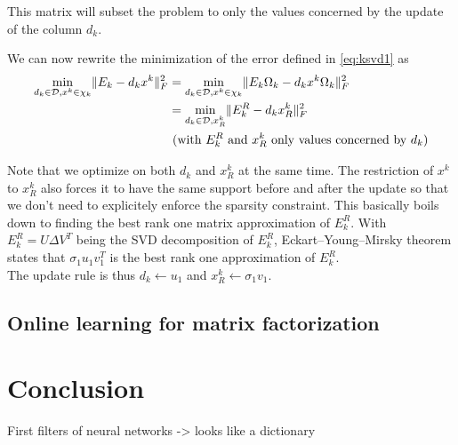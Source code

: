 \documentclass[a4paper,11pt]{article}
\DeclarePairedDelimiter\norm{\lVert}{\rVert} %
\begin{document}
This matrix will subset the problem to only the values concerned by the update of the column $d_k$.

We can now rewrite the minimization of the error defined in \ref{eq:ksvd1} as
\begin{equation*}
\begin{split}
  \min_{d_k \in \mathcal{D}, x^k \in \chi_k} \norm{E_k - d_k x^k }_F^2 & = \min_{d_k \in \mathcal{D}, x^k \in \chi_k} \norm{E_k \Omega_k - d_k x^k \Omega_k}_F^2 \\
  											& = \min_{d_k \in \mathcal{D}, x^k_R} \norm{E_k^R - d_k x^k_R}_F^2 \\
                                            & \text{ (with $E_k^R$ and $x^k_R$ only values concerned by $d_k$)}
\end{split}
\end{equation*}

Note that we optimize on both $d_k$ and $x^k_R$ at the same time. The restriction of $x^k$ to $x^k_R$ also forces it to have the same support before and after the update so that we don't need to explicitely enforce the sparsity constraint.
This basically boils down to finding the best rank one matrix approximation of $E_k^R$.
With $E_k^R = U \Delta V^T$ being the SVD decomposition of $E_k^R$, Eckart–Young–Mirsky theorem states that $\sigma_1 u_1 v_1^T$ is the best rank one approximation of $E_k^R$.\\
The update rule is thus $d_k \leftarrow u_1$ and $x^k_R \leftarrow \sigma_1 v_1$.


\subsection{Online learning for matrix factorization}
\cite{mairal10}

\section{Conclusion}
First filters of neural networks -> looks like a dictionary
\end{document}
